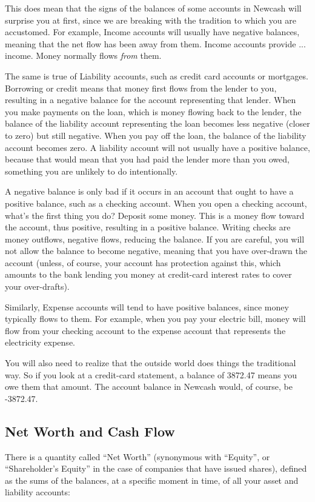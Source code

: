 \documentclass{report}
\begin{document}
This does mean that the signs of the balances of some accounts in Newcash will surprise you at first, since we are breaking with the tradition to which you are accustomed.  For example, Income accounts will usually have negative balances, meaning that the net flow has been away from them.  Income accounts provide ... income. Money normally flows \emph{from} them.

The same is true of Liability accounts, such as credit card accounts or mortgages. Borrowing or credit means that money first flows from the lender to you, resulting in a negative balance for the account representing that lender. When you make payments on the loan, which is money flowing back to the lender, the balance of the liability account representing the loan becomes less negative (closer to zero) but still negative. When you pay off the loan, the balance of the liability account becomes zero. A liability account will not usually have a positive balance, because that would mean that you had paid the lender more than you owed,  something you are unlikely to do intentionally.

A negative balance is only bad if it occurs in an account that ought to have a positive balance, such as a checking account. When you open a checking account, what's the first thing you do? Deposit some money. This is a money flow toward the account, thus positive, resulting in a positive balance. Writing checks are money outflows, negative flows, reducing the balance. If you are careful, you will not allow the balance to become negative, meaning that you have over-drawn the account (unless, of course, your account has protection against this, which amounts to the bank lending you money at credit-card interest rates to cover your over-drafts). 

Similarly, Expense accounts will tend to have positive balances, since money typically flows to them. For example, when you pay your electric bill, money will flow from your checking account to the expense account that represents the electricity expense.

You will also need to realize that the outside world does things the traditional way. So if you look at a credit-card statement, a balance of 3872.47 means you owe them that amount. The account balance in Newcash would, of course, be -3872.47.

\subsection{Net Worth and Cash Flow}
There is a quantity called ``Net Worth'' (synonymous with ``Equity'', or ``Shareholder's Equity'' in the case of companies that have issued shares), defined as the sums of the balances, at a specific moment in time, of all your asset and liability accounts: 
\end{document}
